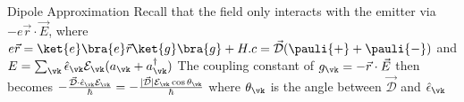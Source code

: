 \begin{frame}{Dipole Approximation }
Recall that the field only interacts with the emitter via $-e\vec{r} \cdot \vec{E}$, where $e \vec{r} = \ket{e}\bra{e}\vec{r}\ket{g}\bra{g} + H.c = \vec{\mathcal{D}}(\pauli{+} + \pauli{-})$ and $E = \sum_{\vk} \hat{\epsilon}_{\vk} \mathcal{E}_{\vk} (a_{\vk} + a^\dagger_{\vk})$\newline
The coupling constant of $g_{\vk}=-\vec{r}\cdot \vec{E}$ then becomes $-\frac{\vec{\mathcal{D}}\cdot \hat{\epsilon}_{\vk}\mathcal{E}_{\vk}}{\hbar} = -\frac{|\vec{\mathcal{D}}|\mathcal{E}_{\vk} \cos \theta_{\vk} }{\hbar}$ \newline where $\theta_{\vk}$ is the angle between $\vec{\mathcal{D}} $ and $\hat{\epsilon}_{\vk}$
\end{frame}

